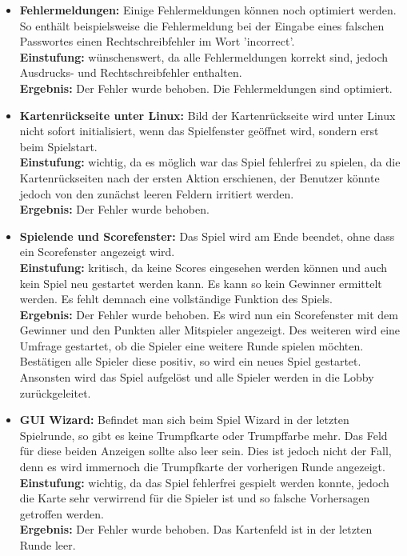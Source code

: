 \documentclass[a4paper]{article}
\begin{document}
\begin{itemize}
	\item \textbf{Fehlermeldungen:} Einige Fehlermeldungen können noch optimiert werden. So enthält beispielsweise die 			Fehlermeldung bei der Eingabe eines falschen Passwortes einen Rechtschreibfehler im Wort 'incorrect'. \\
	\textbf{Einstufung:} wünschenswert, da alle Fehlermeldungen korrekt sind, jedoch Ausdrucks- und Rechtschreibfehler enthalten.\\
	\textbf{Ergebnis:} Der Fehler wurde behoben. Die Fehlermeldungen sind optimiert.\\
	
	\item \textbf{Kartenrückseite unter Linux:} Bild der Kartenrückseite wird unter Linux nicht sofort initialisiert, wenn das 			Spielfenster geöffnet wird, sondern erst beim Spielstart. \\
	\textbf{Einstufung:} wichtig, da es möglich war das Spiel fehlerfrei zu spielen, da die Kartenrückseiten nach der ersten Aktion erschienen, der Benutzer könnte jedoch von den zunächst leeren Feldern irritiert werden.\\
	\textbf{Ergebnis:} Der Fehler wurde behoben.\\
	
	\item \textbf{Spielende und Scorefenster:}  Das Spiel wird am Ende beendet, ohne dass ein Scorefenster angezeigt wird.\\
	\textbf{Einstufung:} kritisch, da keine Scores eingesehen werden können und auch kein Spiel neu gestartet werden kann. Es kann so kein Gewinner ermittelt werden. Es fehlt demnach eine vollständige Funktion des Spiels.\\
	\textbf{Ergebnis:} Der Fehler wurde behoben. Es wird nun ein Scorefenster mit dem Gewinner und den Punkten aller Mitspieler angezeigt. Des weiteren wird eine Umfrage gestartet, ob die Spieler eine weitere Runde spielen möchten. Bestätigen alle Spieler diese positiv, so wird ein neues Spiel gestartet. Ansonsten wird das Spiel aufgelöst und alle Spieler werden in die 		Lobby zurückgeleitet.\\
	
	\item \textbf{GUI Wizard:} Befindet man sich beim Spiel Wizard in der letzten Spielrunde, so gibt es keine Trumpfkarte oder 	Trumpffarbe mehr. Das Feld für diese beiden Anzeigen sollte also leer sein. Dies ist jedoch nicht der Fall, denn es wird 			immernoch die Trumpfkarte der vorherigen Runde angezeigt.\\
	\textbf{Einstufung:} wichtig, da das Spiel fehlerfrei gespielt werden konnte, jedoch die Karte sehr verwirrend für die Spieler ist und so falsche Vorhersagen getroffen werden.\\
	\textbf{Ergebnis:} Der Fehler wurde behoben. Das Kartenfeld ist in der letzten Runde leer.\\
	\end{itemize}
	
\end{document}

